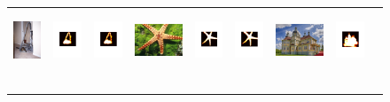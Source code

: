 \documentclass[10pt,twocolumn,letterpaper]{article}
\begin{document}
\begin{figure}
\vspace{-3mm}
\centering
\begin{tabular}{@{}c@{}c@{}c@{}c@{}c@{}c@{}c@{}c@{}c@{}}
\vspace{-0.5mm}
\includegraphics[width=0.105\linewidth,height=1.8cm]{40.jpg} \ &
\includegraphics[width=0.105\linewidth,height=1.8cm]{96.pdf} \ &
\includegraphics[width=0.105\linewidth,height=1.8cm]{16.pdf} \ &
\includegraphics[width=0.105\linewidth,height=1.8cm]{0009.jpg} \ &
\includegraphics[width=0.105\linewidth,height=1.8cm]{9_96.pdf} \ &
\includegraphics[width=0.105\linewidth,height=1.8cm]{9_16.pdf} \ &
\includegraphics[width=0.105\linewidth,height=1.8cm]{0976.jpg} \ &
\includegraphics[width=0.105\linewidth,height=1.8cm]{0976_96.pdf} \ &

\end{tabular}
\end{figure}
\end{document}
